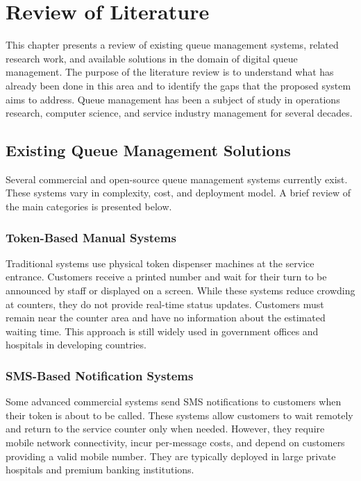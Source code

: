 
\chapter{Review of Literature}

This chapter presents a review of existing queue management systems, related research work, and available solutions in the domain of digital queue management. The purpose of the literature review is to understand what has already been done in this area and to identify the gaps that the proposed system aims to address. Queue management has been a subject of study in operations research, computer science, and service industry management for several decades.

\section{Existing Queue Management Solutions}

Several commercial and open-source queue management systems currently exist. These systems vary in complexity, cost, and deployment model. A brief review of the main categories is presented below.

\subsection{Token-Based Manual Systems}

Traditional systems use physical token dispenser machines at the service entrance. Customers receive a printed number and wait for their turn to be announced by staff or displayed on a screen. While these systems reduce crowding at counters, they do not provide real-time status updates. Customers must remain near the counter area and have no information about the estimated waiting time. This approach is still widely used in government offices and hospitals in developing countries.

\subsection{SMS-Based Notification Systems}

Some advanced commercial systems send SMS notifications to customers when their token is about to be called. These systems allow customers to wait remotely and return to the service counter only when needed. However, they require mobile network connectivity, incur per-message costs, and depend on customers providing a valid mobile number. They are typically deployed in large private hospitals and premium banking institutions.

